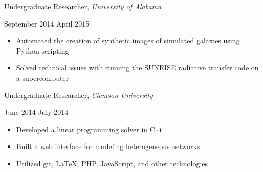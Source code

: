 \documentclass[11pt]{article}
\begin{document}
\vspace{0.4em}
\begin{minipage}[t]{0.65\textwidth}
\flushleft
Undergraduate Researcher, \textit{University of Alabama}\\
\end{minipage}
\begin{minipage}[t]{0.30\textwidth}
\flushright
September 2014 \space \textemdash \space April 2015\\
\end{minipage}

\begin{itemize}
  \item Automated the creation of synthetic images of simulated galaxies using Python scripting
  \item Solved technical issues with running the SUNRISE radiative transfer code on a supercomputer
\end{itemize}

\begin{minipage}[t]{0.65\textwidth}
\flushleft
Undergraduate Researcher, \textit{Clemson University}\\
\end{minipage}
\begin{minipage}[t]{0.30\textwidth}
\flushright
June 2014 \space \textemdash \space July 2014\\
\end{minipage}

\begin{itemize}
  \item Developed a linear programming solver in C\texttt{++}
  \item Built a web interface for modeling heterogeneous networks
  \item Utilized git, \LaTeX, PHP, JavaScript, and other technologies
\end{itemize}
\end{document}
